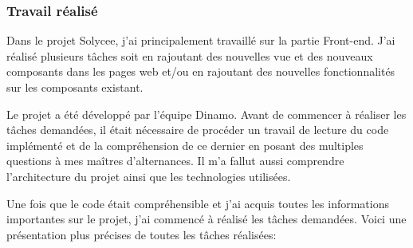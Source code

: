 \documentclass[12pt]{article}
\begin{document}
\subsubsection{Travail réalisé}

Dans le projet Solycee, j'ai principalement travaillé sur la partie Front-end. J'ai réalisé plusieurs tâches soit en rajoutant des nouvelles vue et des nouveaux composants dans les pages web et/ou en rajoutant des nouvelles fonctionnalités sur les composants existant.

Le projet a été développé par l'équipe Dinamo. Avant de commencer à réaliser les tâches demandées, il était nécessaire de procéder un travail  de lecture du code implémenté et de la compréhension de ce dernier en posant des multiples questions à mes maîtres d'alternances. Il m'a fallut aussi comprendre l'architecture du projet ainsi que les technologies utilisées. 

Une fois que le code était compréhensible et j'ai acquis toutes les informations importantes sur le projet, j'ai commencé à réalisé les tâches demandées.  Voici une présentation plus précises de toutes les tâches réalisées:   
\end{document}
